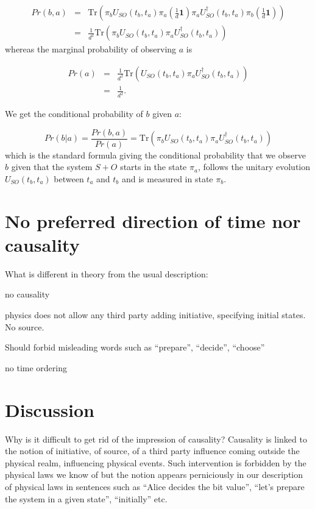 \documentclass[11pt,amsmath,amssymb,latexsym,a4paper]{article}
\newcommand{\Tr}[1]{\textrm{Tr}\left({#1}\right)}
\newcommand{\toshIdentity}{{\mathbf{1}}}
\begin{document}
\begin{eqnarray}
Pr(b,a) &=& \Tr{ \pi_b U_{SO}(t_b,t_a) \pi_a \left(\frac{1}{d}\toshIdentity\right) \pi_a U^\dag_{SO}(t_b,t_a) \pi_b\left(\frac{1}{d}\toshIdentity\right) }\\
&=&\frac{1}{d^2}\Tr{ \pi_b U_{SO}(t_b,t_a) \pi_a  U^\dag_{SO}(t_b,t_a) }
\end{eqnarray}
whereas the marginal probability of observing $a$ is 

\begin{eqnarray}
Pr(a) &=&\frac{1}{d^2}\Tr{U_{SO}(t_b,t_a) \pi_a  U^\dag_{SO}(t_b,t_a)}\\
&=& \frac{1}{d^2}.
\end{eqnarray}

We get the conditional probability of $b$ given $a$:

\begin{equation}
Pr(b|a) = \frac{Pr(b,a)}{Pr(a)} = \Tr{\pi_b U_{SO}(t_b,t_a) \pi_a  U^\dag_{SO}(t_b,t_a)}
\end{equation}
which is the standard formula giving the conditional probability that we observe $b$ given that the system $S+O$ starts in the state $\pi_a$, follows the unitary evolution $U_{SO}(t_b,t_a)$ between $t_a$ and $t_b$ and is measured in state $\pi_b$.

\section{No preferred direction of time nor causality}

What is different in theory from the usual description:

no causality 

physics does not allow any third party adding initiative, specifying initial states. No source.

Should forbid misleading words such as ``prepare'', ``decide'', ``choose''

no time ordering

\section{Discussion}
Why is it difficult to get rid of the impression of causality? Causality is linked to the notion of initiative, of source, of a third party influence coming outside the physical realm, influencing physical events. Such intervention is forbidden by the physical laws we know of but the notion appears perniciously in our description of physical laws in sentences such as ``Alice decides the bit value'', ``let's prepare the system in a given state'', ``initially'' etc.
\end{document}
